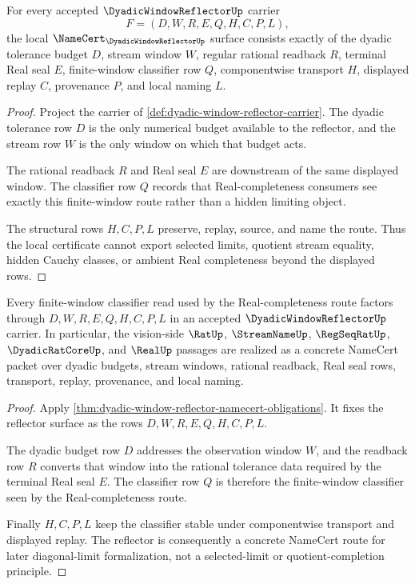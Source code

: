 \begin{theorem}
\label{thm:dyadic-window-reflector-namecert-obligations}
For every accepted $\DyadicWindowReflectorUp$ carrier
$$
F=(D,W,R,E,Q,H,C,P,L),
$$
the local $\NameCert_{\DyadicWindowReflectorUp}$ surface consists exactly of the dyadic tolerance budget $D$, stream window $W$, regular rational readback $R$, terminal Real seal $E$, finite-window classifier row $Q$, componentwise transport $H$, displayed replay $C$, provenance $P$, and local naming $L$.
\end{theorem}
\begin{proof}
Project the carrier of \autoref{def:dyadic-window-reflector-carrier}. The dyadic tolerance row $D$ is the only numerical budget available to the reflector, and the stream row $W$ is the only window on which that budget acts.

The rational readback $R$ and Real seal $E$ are downstream of the same displayed window. The classifier row $Q$ records that Real-completeness consumers see exactly this finite-window route rather than a hidden limiting object.

The structural rows $H,C,P,L$ preserve, replay, source, and name the route. Thus the local certificate cannot export selected limits, quotient stream equality, hidden Cauchy classes, or ambient Real completeness beyond the displayed rows.
\end{proof}

\begin{theorem}
\label{thm:dyadic-window-reflector-vision-route}
Every finite-window classifier read used by the Real-completeness route factors through $D,W,R,E,Q,H,C,P,L$ in an accepted $\DyadicWindowReflectorUp$ carrier. In particular, the vision-side $\RatUp$, $\StreamNameUp$, $\RegSeqRatUp$, $\DyadicRatCoreUp$, and $\RealUp$ passages are realized as a concrete NameCert packet over dyadic budgets, stream windows, rational readback, Real seal rows, transport, replay, provenance, and local naming.
\end{theorem}
\begin{proof}
Apply \autoref{thm:dyadic-window-reflector-namecert-obligations}. It fixes the reflector surface as the rows $D,W,R,E,Q,H,C,P,L$.

The dyadic budget row $D$ addresses the observation window $W$, and the readback row $R$ converts that window into the rational tolerance data required by the terminal Real seal $E$. The classifier row $Q$ is therefore the finite-window classifier seen by the Real-completeness route.

Finally $H,C,P,L$ keep the classifier stable under componentwise transport and displayed replay. The reflector is consequently a concrete NameCert route for later diagonal-limit formalization, not a selected-limit or quotient-completion principle.
\end{proof}

